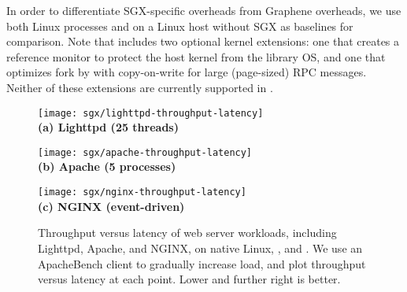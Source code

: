 In order to differentiate SGX-specific overheads 
from Graphene overheads,
we use both
Linux processes and \graphene{} on a Linux host without SGX as baselines
for comparison.
Note that \graphene{} includes two optional kernel extensions:
one that creates a reference monitor to protect the host kernel from 
the library OS, and one that optimizes fork by 
with copy-on-write for large (page-sized) RPC messages.
Neither of these extensions are currently supported in \graphenesgx{}.

\begin{figure*}[t!]
\centering

\begin{minipage}{.3\textwidth}
\centering
\footnotesize
\texttt{[image: sgx/lighttpd-throughput-latency]}\\
{\bf (a) Lighttpd (25 threads)}
\end{minipage}
\begin{minipage}{.3\textwidth}
\centering
\footnotesize
\texttt{[image: sgx/apache-throughput-latency]}\\
{\bf (b) Apache (5 processes)}
\end{minipage}
\begin{minipage}{.3\textwidth}
\centering
\footnotesize
\texttt{[image: sgx/nginx-throughput-latency]}\\
{\bf (c) NGINX (event-driven)}
\end{minipage}

\caption{Throughput versus latency of web server workloads, including Lighttpd, Apache, and NGINX, on native Linux, \graphene{}, and \graphenesgx{}.
We use an ApacheBench client to gradually increase load, and plot
throughput versus latency at each point.  Lower and further right
is better.
}
\label{fig:server-throughput-latency}
\end{figure*}


